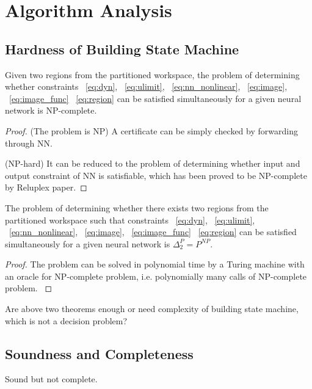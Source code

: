 \section{Algorithm Analysis}

\subsection{Hardness of Building State Machine}

\begin{theorem}
    Given two regions from the partitioned workspace, the problem of determining whether constraints
    ~\eqref{eq:dyn}, ~\eqref{eq:ulimit}, ~\eqref{eq:nn_nonlinear}, ~\eqref{eq:image}, ~\eqref{eq:image_func}
    ~\eqref{eq:region}
    can be satisfied simultaneously for a given neural network is NP-complete.
\end{theorem}    

\begin{proof}
    {\color{blue} 
    (The problem is NP) A certificate can be simply checked by forwarding through NN.

    (NP-hard) It can be reduced to the problem of determining whether input and output constraint of NN is satisfiable, 
    which has been proved to be NP-complete by Reluplex paper.
    }
\end{proof}


\begin{theorem}
    The problem of determining whether there exists two regions from the partitioned workspace such that constraints
    ~\eqref{eq:dyn}, ~\eqref{eq:ulimit}, ~\eqref{eq:nn_nonlinear}, ~\eqref{eq:image}, ~\eqref{eq:image_func}
    ~\eqref{eq:region}
    can be satisfied simultaneously for a given neural network is $\Delta_2^P = P^{NP}$.
\end{theorem}    

\begin{proof}
    {\color{blue} 
    The problem can be solved in polynomial time by a Turing machine with an oracle for NP-complete problem, 
    i.e. polynomially many calls of NP-complete problem.
    }
\end{proof}    



{\color{blue} Are above two theorems enough or need complexity of building state machine, which is not a decision problem?}


\subsection{Soundness and Completeness}
{\color{blue} Sound but not complete.}

